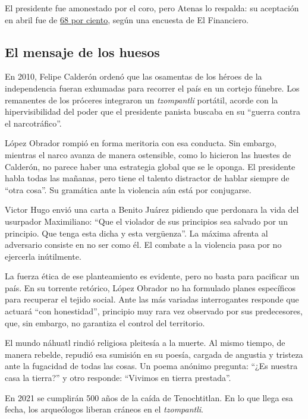 El presidente fue amonestado por el coro, pero Atenas lo respalda: su
aceptación en abril fue de
\href{https://politica.expansion.mx/mexico/2020/05/04/la-aprobacion-de-amlo-registra-un-alza-de-ocho-puntos-segun-encuesta}{68
por ciento}, según una encuesta de El Financiero.

\hypertarget{el-mensaje-de-los-huesos}{%
\subsection{El mensaje de los huesos}\label{el-mensaje-de-los-huesos}}

En 2010, Felipe Calderón ordenó que las osamentas de los héroes de la
independencia fueran exhumadas para recorrer el país en un cortejo
fúnebre. Los remanentes de los próceres integraron un \emph{tzompantli}
portátil, acorde con la hipervisibilidad del poder que el presidente
panista buscaba en su ``guerra contra el narcotráfico''.

López Obrador rompió en forma meritoria con esa conducta. Sin embargo,
mientras el narco avanza de manera ostensible, como lo hicieron las
huestes de Calderón, no parece haber una estrategia global que se le
oponga. El presidente habla todas las mañanas, pero tiene el talento
distractor de hablar siempre de ``otra cosa''. Su gramática ante la
violencia aún está por conjugarse.

Victor Hugo envió una carta a Benito Juárez pidiendo que perdonara la
vida del usurpador Maximiliano: ``Que el violador de sus principios sea
salvado por un principio. Que tenga esta dicha y esta vergüenza''. La
máxima afrenta al adversario consiste en no ser como él. El combate a la
violencia pasa por no ejercerla inútilmente.

La fuerza ética de ese planteamiento es evidente, pero no basta para
pacificar un país. En su torrente retórico, López Obrador no ha
formulado planes específicos para recuperar el tejido social. Ante las
más variadas interrogantes responde que actuará ``con honestidad'',
principio muy rara vez observado por sus predecesores, que, sin embargo,
no garantiza el control del territorio.

El mundo náhuatl rindió religiosa pleitesía a la muerte. Al mismo
tiempo, de manera rebelde, repudió esa sumisión en su poesía, cargada de
angustia y tristeza ante la fugacidad de todas las cosas. Un poema
anónimo pregunta: ``¿Es nuestra casa la tierra?'' y otro responde:
``Vivimos en tierra prestada''.

En 2021 se cumplirán 500 años de la caída de Tenochtitlan. En lo que
llega esa fecha, los arqueólogos liberan cráneos en el
\emph{tzompantli}.

